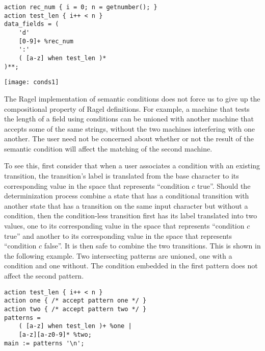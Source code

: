\documentclass[letterpaper,11pt,oneside]{book}
\newcommand{\graphspace}{\vspace{10pt}}
\newenvironment{inline_code}{\def\baselinestretch{1}\vspace{12pt}\small}{}
\begin{document}
\begin{inline_code}
\begin{verbatim}
action rec_num { i = 0; n = getnumber(); }
action test_len { i++ < n }
data_fields = (
    'd' 
    [0-9]+ %rec_num 
    ':'
    ( [a-z] when test_len )*
)**;
\end{verbatim}
\end{inline_code}

\graphspace
\begin{center}
\texttt{[image: conds1]}
\end{center}
\graphspace

The Ragel implementation of semantic conditions does not force us to give up the
compositional property of Ragel definitions. For example, a machine that tests
the length of a field using conditions can be unioned with another machine
that accepts some of the same strings, without the two machines interfering with
one another. The user need not be concerned about whether or not the result of the
semantic condition will affect the matching of the second machine.

To see this, first consider that when a user associates a condition with an
existing transition, the transition's label is translated from the base character
to its corresponding value in the space that represents ``condition $c$ true''. Should
the determinization process combine a state that has a conditional transition
with another state that has a transition on the same input character but
without a condition, then the condition-less transition first has its label
translated into two values, one to its corresponding value in the space that
represents ``condition $c$ true'' and another to its corresponding value in the
space that represents ``condition $c$ false''. It
is then safe to combine the two transitions. This is shown in the following
example.  Two intersecting patterns are unioned, one with a condition and one
without. The condition embedded in the first pattern does not affect the second
pattern.

\begin{inline_code}
\begin{verbatim}
action test_len { i++ < n }
action one { /* accept pattern one */ }
action two { /* accept pattern two */ }
patterns = 
    ( [a-z] when test_len )+ %one |
    [a-z][a-z0-9]* %two;
main := patterns '\n';
\end{verbatim}
\end{inline_code}
\end{document}
